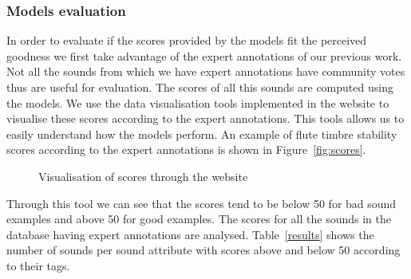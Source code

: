 \documentclass{article}
\begin{document}
\subsubsection{Models evaluation}
In order to evaluate if the scores provided by the models fit the perceived goodness we first take advantage of the expert annotations of our previous work. Not all the sounds from which we have expert annotations have community votes thus are useful for evaluation. The scores of all this sounds are computed using the models. We use the data visualisation tools implemented in the website to visualise these scores according to the expert annotations. This tools allows us to easily understand how the models perform. An example of flute timbre stability scores according to the expert annotations is shown in Figure~\ref{fig:scores}.

\begin{figure}
 \centerline{}
 \caption{Visualisation of scores through the website}
 \label{fig:scores_3}
\end{figure}

Through this tool we can see that the scores tend to be below 50 for bad sound examples and above 50 for good examples. The scores for all the sounds in the database having expert annotations are analysed. Table~\ref{results} shows the number of sounds per sound attribute with scores above and below 50 according to their tags.
\end{document}
